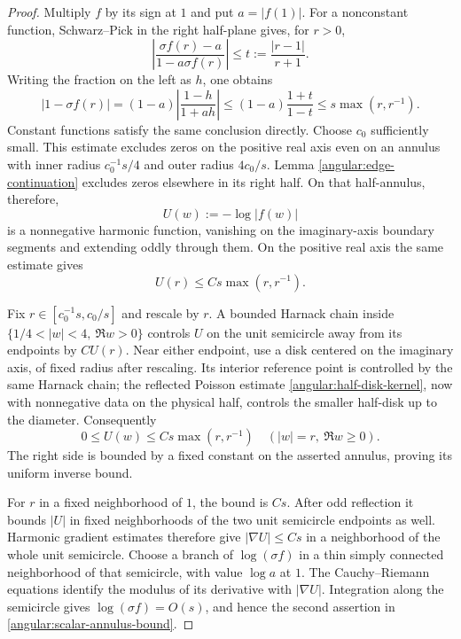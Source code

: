 \begin{proof}
Multiply $f$ by its sign at $1$ and put $a=|f(1)|$.  For a nonconstant
function, Schwarz--Pick in the right half-plane gives, for $r>0$,
\[
 \left|\frac{\sigma f(r)-a}{1-a\sigma f(r)}\right|
 \le t:=\frac{|r-1|}{r+1}.
\]
Writing the fraction on the left as $h$, one obtains
\[
 |1-\sigma f(r)|
 = (1-a)\left|\frac{1-h}{1+ah}\right|
 \le (1-a)\frac{1+t}{1-t}
 \le s\max(r,r^{-1}).
\]
Constant functions satisfy the same conclusion directly.  Choose
$c_0$ sufficiently small.  This estimate excludes zeros on the
positive real axis even on an annulus with inner radius
$c_0^{-1}s/4$ and outer radius $4c_0/s$.  Lemma
\ref{angular:edge-continuation} excludes zeros elsewhere in its right
half.  On that half-annulus, therefore,
\[
 U(w):=-\log|f(w)|
\]
is a nonnegative harmonic function, vanishing on the imaginary-axis
boundary segments and extending oddly through them.  On the positive
real axis the same estimate gives
\begin{equation}\label{angular:radial-log-bound}
 U(r)\le Cs\max(r,r^{-1}).
\end{equation}

Fix $r\in[c_0^{-1}s,c_0/s]$ and rescale by $r$.  A bounded Harnack
chain inside $\{1/4<|w|<4,\ \Re w>0\}$ controls $U$ on the unit
semicircle away from its endpoints by $CU(r)$.  Near either endpoint,
use a disk centered on the imaginary axis, of fixed radius after
rescaling.  Its interior reference point is controlled by the same
Harnack chain; the reflected Poisson estimate
\eqref{angular:half-disk-kernel}, now with nonnegative data on the
physical half, controls the smaller half-disk up to the diameter.
Consequently
\begin{equation}\label{angular:semicircle-log-bound}
 0\le U(w)\le Cs\max(r,r^{-1})
 \quad (|w|=r,\ \Re w\ge0).
\end{equation}
The right side is bounded by a fixed constant on the asserted
annulus, proving its uniform inverse bound.

For $r$ in a fixed neighborhood of $1$, the bound is $Cs$.
After odd reflection it bounds $|U|$ in fixed neighborhoods of the
two unit semicircle endpoints as well.  Harmonic gradient estimates
therefore give $|\nabla U|\le Cs$ in a neighborhood of the whole unit
semicircle.  Choose a branch of $\log(\sigma f)$ in a thin simply
connected neighborhood of that semicircle, with value $\log a$ at
$1$.  The Cauchy--Riemann equations identify the modulus of its
derivative with $|\nabla U|$.  Integration along the semicircle gives
$\log(\sigma f)=O(s)$, and hence the second assertion in
\eqref{angular:scalar-annulus-bound}.


\end{proof}
